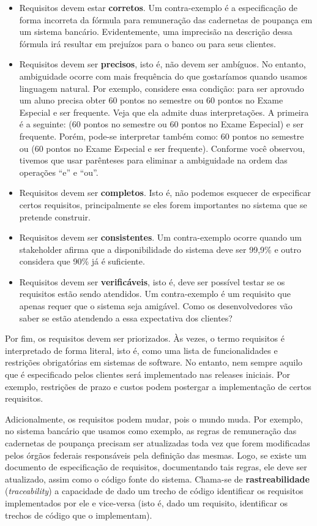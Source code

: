 \documentclass[
  11pt,
  twoside]{book}
\begin{document}
\begin{itemize}
\item
  Requisitos devem estar \textbf{corretos}. Um contra-exemplo é a
  especificação de forma incorreta da fórmula para remuneração das
  cadernetas de poupança em um sistema bancário. Evidentemente, uma
  imprecisão na descrição dessa fórmula irá resultar em prejuízos para o
  banco ou para seus clientes.
\item
  Requisitos devem ser \textbf{precisos}, isto é, não devem ser
  ambíguos. No entanto, ambiguidade ocorre com mais frequência do que
  gostaríamos quando usamos linguagem natural. Por exemplo, considere
  essa condição: para ser aprovado um aluno precisa obter 60 pontos no
  semestre ou 60 pontos no Exame Especial e ser frequente. Veja que ela
  admite duas interpretações. A primeira é a seguinte: (60 pontos no
  semestre ou 60 pontos no Exame Especial) e ser frequente. Porém,
  pode-se interpretar também como: 60 pontos no semestre ou (60 pontos
  no Exame Especial e ser frequente). Conforme você observou, tivemos
  que usar parênteses para eliminar a ambiguidade na ordem das operações
  ``e'' e ``ou''.
\item
  Requisitos devem ser \textbf{completos}. Isto é, não podemos esquecer
  de especificar certos requisitos, principalmente se eles forem
  importantes no sistema que se pretende construir.
\item
  Requisitos devem ser \textbf{consistentes}. Um contra-exemplo ocorre
  quando um stakeholder afirma que a disponibilidade do sistema deve ser
  99,9\% e outro considera que 90\% já é suficiente.
\item
  Requisitos devem ser \textbf{verificáveis}, isto é, deve ser possível
  testar se os requisitos estão sendo atendidos. Um contra-exemplo é um
  requisito que apenas requer que o sistema seja amigável. Como os
  desenvolvedores vão saber se estão atendendo a essa expectativa dos
  clientes?
\end{itemize}

Por fim, os requisitos devem ser priorizados. Às vezes, o termo
requisitos é interpretado de forma literal, isto é, como uma lista de
funcionalidades e restrições obrigatórias em sistemas de software. No
entanto, nem sempre aquilo que é especificado pelos clientes será
implementado nas releases iniciais. Por exemplo, restrições de prazo e
custos podem postergar a implementação de certos requisitos.

Adicionalmente, os requisitos podem mudar, pois o mundo muda. Por
exemplo, no sistema bancário que usamos como exemplo, as regras de
remuneração das cadernetas de poupança precisam ser atualizadas toda vez
que forem modificadas pelos órgãos federais responsáveis pela definição
das mesmas. Logo, se existe um documento de especificação de requisitos,
documentando tais regras, ele deve ser atualizado, assim como o código
fonte do sistema. Chama-se de \textbf{rastreabilidade}
(\emph{traceability}) a capacidade de dado um trecho de código
identificar os requisitos implementados por ele e vice-versa (isto é,
dado um requisito, identificar os trechos de código que o implementam).
\end{document}
